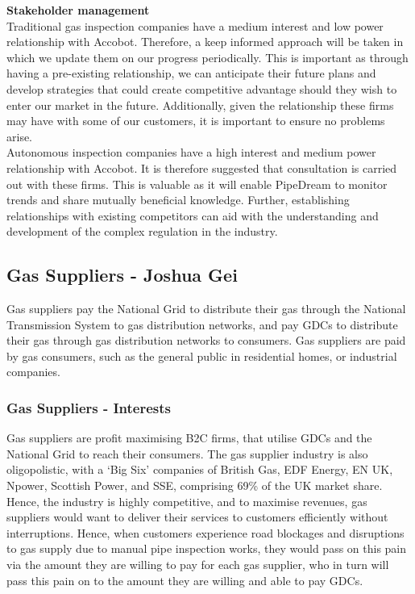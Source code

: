 \documentclass[11pt]{article}		%
\begin{document}
            \textbf{Stakeholder management}\\
            Traditional gas inspection companies have a medium interest and low power relationship with Accobot. Therefore, a keep informed approach will be taken in which we update them on our progress periodically. This is important as through having a pre-existing relationship, we can anticipate their future plans and develop strategies that could create competitive advantage should they wish to enter our market in the future. Additionally, given the relationship these firms may have with some of our customers, it is important to ensure no problems arise. \\
            \hspace*{3ex}Autonomous inspection companies have a high interest and medium power relationship with Accobot. It is therefore suggested that consultation is carried out with these firms. This is valuable as it will enable PipeDream to monitor trends and share mutually beneficial knowledge. Further, establishing relationships with existing competitors can aid with the understanding and development of the complex regulation in the industry.

		\subsection[Gas Suppliers]{Gas Suppliers - Joshua Gei}
		Gas suppliers pay the National Grid to distribute their gas through the National Transmission System to gas distribution networks, and pay GDCs to distribute their gas through gas distribution networks to consumers. Gas suppliers are paid by gas consumers, such as the general public in residential homes, or industrial companies.   
		\subsubsection{Gas Suppliers - Interests}
	    Gas suppliers are profit maximising B2C firms, that utilise GDCs and the National Grid to reach their consumers. The gas supplier industry is also oligopolistic, with a ‘Big Six’ companies of British Gas, EDF Energy, EN UK, Npower, Scottish Power, and SSE, comprising 69\% of the UK market share. 
        \\Hence, the industry is highly competitive, and to maximise revenues, gas suppliers would want to deliver their services to customers efficiently without interruptions. Hence, when customers experience road blockages and disruptions to gas supply due to manual pipe inspection works, they would pass on this pain via the amount they are willing to pay for each gas supplier, who in turn will pass this pain on to the amount they are willing and able to pay GDCs.
\end{document}
